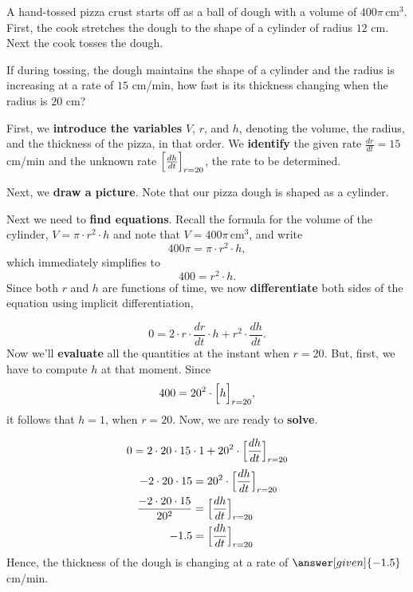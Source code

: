 \documentclass{ximera}
\begin{document}
\begin{example}
A hand-tossed pizza crust starts off as a ball of dough with a volume
of $400\pi\, \text{cm}^3$. First, the cook stretches the dough to the
shape of a cylinder of radius $12$ cm. Next the cook tosses the
dough.

If during tossing, the dough maintains the shape of a cylinder and the
radius is increasing at a rate of $15$ cm/min, how fast is its
thickness changing when the radius is $20$ cm?
\begin{explanation}
 First, we \textbf{introduce the variables} $V$, $r$, and $h$, denoting the volume, the radius, and the thickness of the pizza, in that order. We \textbf{identify} the given rate $\frac{dr}{dt}=15$ cm/min and the unknown rate $\Bigl[\frac{dh}{dt}\Bigr]_{r=20}$, the rate to be determined.   

  Next, we \textbf{draw a picture}. Note that our pizza dough is shaped as a cylinder.
 
  \begin{image}
  \end{image}
  Next we need to \textbf{find equations}. Recall the formula for the volume of the cylinder, $V=\pi\cdot r^2\cdot h$ and note that $V=400\pi\, \text{cm}^3$, and write
    \[
  400\pi = \pi \cdot r^2 \cdot h,
  \]
  which immediately simplifies to
  \[
  400 = r^2 \cdot h.
  \]
  Since both $r$ and $h$ are functions of time, we now  \textbf{differentiate} both sides of  the equation using implicit differentiation,
 
  \[
  0 = 2\cdot r \cdot \frac{dr}{dt} \cdot h+ r^2 \cdot \frac{dh}{dt}.
  \]
  Now we'll \textbf{evaluate} all  the quantities at the instant when $r=20$. 
  But, first, we have to compute $h$ at that moment. Since
  \[
 400 = 20^2 \cdot \Bigl[h\Bigr]_{r=20} ,
  \] it follows that $h=1$, when $r=20$. Now, we are ready to \textbf{solve}.
  
 \[
 0 = 2\cdot 20 \cdot 15 \cdot 1 + 20^2 \cdot \Bigl[\frac{dh}{dt}\Bigr]_{r=20}
  \]
  \begin{align*}
    -2\cdot 20 \cdot 15  &= 20^2 \cdot  \Bigl[\frac{dh}{dt}\Bigr]_{r=20}\\
    \frac{-2\cdot20 \cdot 15}{20^2}  &=  \Bigl[\frac{dh}{dt}\Bigr]_{r=20}\\
    -1.5  &=  \Bigl[\frac{dh}{dt}\Bigr]_{r=20}
  \end{align*}
  Hence, the thickness of the dough is changing at a rate of $\answer[given]{-1.5}$
  cm/min.
\end{explanation}
\end{example}
\end{document}
